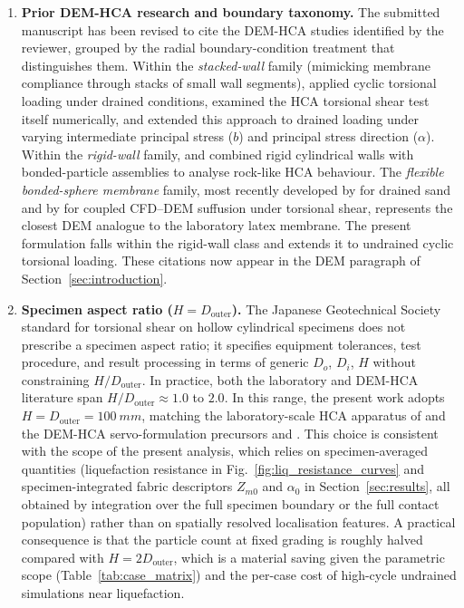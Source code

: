 \documentclass[11pt,a4paper]{article}
\begin{document}
\begin{enumerate}[leftmargin=*,label=(\arabic*),topsep=4pt,itemsep=6pt]
\item \textbf{Prior DEM-HCA research and boundary taxonomy.}
The submitted manuscript has been revised to cite the DEM-HCA
studies identified by the reviewer, grouped by the radial
boundary-condition treatment that distinguishes them. Within the
\emph{stacked-wall} family (mimicking membrane compliance through
stacks of small wall segments), \citet{LiGuoZhang2014} applied
cyclic torsional loading under drained conditions,
\citet{LiZhangGutierrez2015} examined the HCA torsional shear test
itself numerically, and \citet{LiChenGutierrez2017} extended this
approach to drained loading under varying intermediate principal
stress ($b$) and principal stress direction ($\alpha$). Within the
\emph{rigid-wall} family, \citet{Shi2021} and \citet{Liu2021}
combined rigid cylindrical walls with bonded-particle assemblies
to analyse rock-like HCA behaviour. The \emph{flexible
bonded-sphere membrane} family, most recently developed by
\citet{Song2024} for drained sand and by \citet{Song2024suffusion}
for coupled CFD--DEM suffusion under torsional shear, represents
the closest DEM analogue to the laboratory latex membrane. The
present formulation falls within the rigid-wall class and extends
it to undrained cyclic torsional loading. These citations now
appear in the DEM paragraph of Section~\ref{sec:introduction}.

\item \textbf{Specimen aspect ratio ($H=D_{\text{outer}}$).}
The Japanese Geotechnical Society standard for torsional shear on
hollow cylindrical specimens \citep{JGS0551_2020} does not prescribe
a specimen aspect ratio; it specifies equipment tolerances, test
procedure, and result processing in terms of generic $D_o$, $D_i$,
$H$ without constraining $H/D_{\text{outer}}$. In practice, both
the laboratory and DEM-HCA literature span
$H/D_{\text{outer}}\approx 1.0$ to $2.0$. In this range, the present work adopts
$H=D_{\text{outer}}=\SI{100}{mm}$, matching the laboratory-scale
HCA apparatus of \citet{Vargas2020} and the DEM-HCA
servo-formulation precursors \citet{Han2024jgs} and \citet{Ma2024}.
This choice is consistent with the scope of the present analysis,
which relies on specimen-averaged quantities (liquefaction
resistance in Fig.~\ref{fig:liq_resistance_curves} and
specimen-integrated fabric descriptors $Z_{m0}$ and $\alpha_0$ in
Section~\ref{sec:results}, all obtained by integration over the full
specimen boundary or the full contact population) rather than on
spatially resolved localisation features. A practical
consequence is that the particle count at fixed grading is roughly
halved compared with $H=2D_{\text{outer}}$, which is a material
saving given the parametric scope (Table~\ref{tab:case_matrix})
and the per-case cost of high-cycle undrained simulations near
liquefaction.
\end{enumerate}
\end{document}
